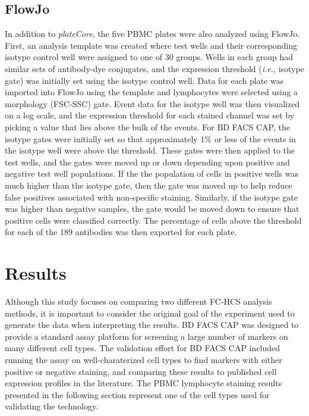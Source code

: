 \documentclass[12pt]{article}
\newcommand{\Rpackage}[1]{{\textit{#1}}}
\begin{document}
\subsection*{FlowJo}

In addition to \Rpackage{plateCore}, the five PBMC plates were also analyzed
using FlowJo. First, an analysis template was created where test wells and
their corresponding isotype control well were assigned to one of 30 groups.
Wells in each group had similar sets of antibody-dye conjugates, and
the expression threshold (\emph{i.e.}, isotype gate) was initially set using
the isotype control well. Data for each plate was imported into FlowJo using
the template and lymphocytes were selected using a morphology (FSC-SSC) gate.
Event data for the isotype well was then visualized on a log scale, and the
expression threshold for each stained channel was set by picking a value that
lies above the bulk of the events. For BD FACS CAP, the isotype gates were
initially set so that approximately 1\% or less of the events in the isotype
well were above the threshold. These gates were then applied to the test wells,
and the gates were moved up or down depending upon positive and negative test
well populations. If the the population of cells in positive wells was much
higher than the isotype gate, then the gate was moved up to help reduce false
positives associated with non-specific staining.  Similarly, if the isotype
gate was higher than negative samples, the gate would be moved down to ensure
that positive cells were classified correctly. The percentage of cells above
the threshold for each of the 189 antibodies was then exported for each plate.

\section*{Results}

Although this study focuses on comparing two different FC-HCS analysis methods,
it is important to consider the original goal of the experiment used to generate
the data when interpreting the results. BD FACS CAP was designed to provide a
standard assay platform for screening a large number of markers on many
different cell types. The validation effort for BD FACS CAP included running
the assay on well-charaterized cell types to find markers with either positive
or negative staining, and comparing these results to published cell expression
profiles in the literature. The PBMC lymphocyte staining results presented in
the following section represent one of the cell types used for validating the
technology.
\end{document}
